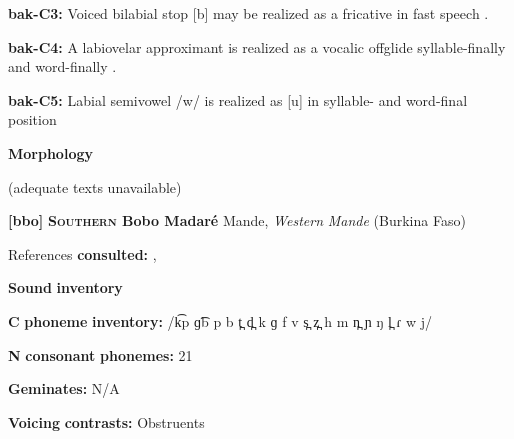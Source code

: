 \begin{styleBody}
\textbf{bak-C3:} Voiced bilabial stop [b] may be realized as a fricative in fast speech \citep[8]{Poppe1964}.
\end{styleBody}

\begin{styleBody}
\textbf{bak-C4:}  A labiovelar approximant is realized as a vocalic offglide syllable-finally and word-finally \citep[9]{Poppe1964}.
\end{styleBody}

\begin{styleBody}
\textbf{bak-C5:} Labial semivowel /w/ is realized as [u] in syllable- and word-final position \citep[9]{Poppe1964}
\end{styleBody}

\begin{styleBody}
\textbf{Morphology}
\end{styleBody}

\begin{styleBody}
(adequate texts unavailable)
\end{styleBody}

\begin{styleBody}
\textbf{[bbo]}   \textbf{\textsc{Southern} \textbf{Bobo} \textbf{Madaré}}  Mande, \textit{Western} \textit{Mande} (Burkina Faso)
\end{styleBody}

\begin{styleBody}
References \textbf{consulted:} \citet{Morse1976}, \citet{Sanou1978}
\end{styleBody}

\begin{styleBody}
\textbf{Sound} \textbf{inventory}
\end{styleBody}

\begin{styleBody}
\textbf{C} \textbf{phoneme} \textbf{inventory:} /k͡p ɡ͡b p b t̪ d̪ k ɡ f v s̪ z̪ h m n̪ ɲ ŋ l̪ ɾ w j/
\end{styleBody}

\begin{styleBody}
\textbf{N} \textbf{consonant} \textbf{phonemes:} 21
\end{styleBody}

\begin{styleBody}
\textbf{Geminates:} N/A
\end{styleBody}

\begin{styleBody}
\textbf{Voicing} \textbf{contrasts:} Obstruents
\end{styleBody}

